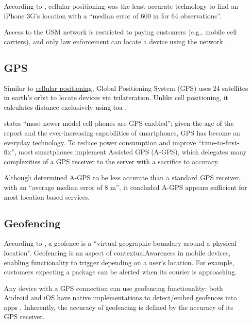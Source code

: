 According to \cite{locationComparison}, cellular
positioning was the least accurate technology to find an
iPhone 3G's location with a \enquote{median error of 600 m
  for 64 observations}.

Access to the GSM network is restricted to paying customers
(e.g., mobile cell carriers), and only law enforcement can
locate a device using the network
\parencite{howCellTowerTriWorks}.

\subsection{GPS} \label{ss:gps}

Similar to \hyperref[ss:cellPos]{cellular positioning},
Global Positioning System (GPS) uses 24 satellites in
earth's orbit to locate devices via \gls{trilateration}.
Unlike cell positioning, it calculates distance exclusively
using \gls{toa} \parencite{suveryOfCellPos}.

\cite{locationComparison} states \enquote{most newer model
  cell phones are GPS-enabled}; given the age of the report
and the ever-increasing capabilities of smartphones, GPS
has become an everyday technology.
To reduce power consumption and improve
\enquote{time-to-first-fix}, most smartphones implement
Assisted GPS (A-GPS), which delegates many complexities of
a GPS receiver to the server with a sacrifice to accuracy.

Although \cite{locationComparison} determined A-GPS to be
less accurate than a standard GPS receiver, with an
\enquote{average median error of 8 m}, it concluded A-GPS
appears sufficient for most location-based services.

\subsection{Geofencing}
\label{ss:geofencing}

According to \cite{whatIsGeofencing}, a geofence is a
\enquote{virtual geographic boundary around a physical
  location}.
Geofencing is an aspect of \gls{contextualAwareness} in
mobile devices, enabling functionality to trigger depending
on a user's location.
For example, customers expecting a package can be alerted
when its courier is approaching.

Any device with a GPS connection can use geofencing
functionality; both Android and iOS have native
implementations to detect/embed geofences into apps
\parencite{androidGeofencingApi,iosGeofencingApi}.
Inherently, the accuracy of geofencing is defined by the
accuracy of its GPS receiver.

